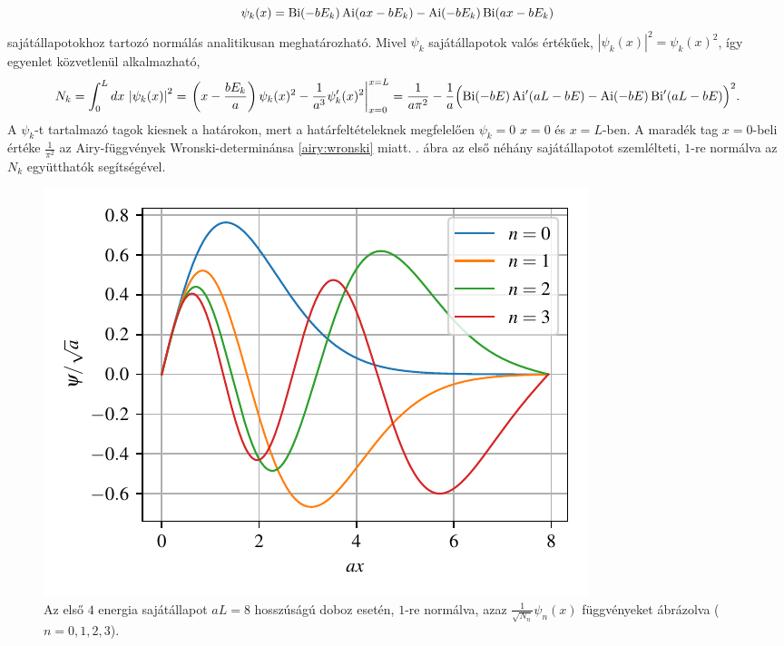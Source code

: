 \begin{equation}
	\psi_k(x) = \operatorname{Bi}(-bE_k)\operatorname{Ai}(ax-bE_k) - \operatorname{Ai}(-bE_k)\operatorname{Bi}(ax-bE_k)
\end{equation}
sajátállapotokhoz tartozó normálás analitikusan meghatározható. Mivel $\psi_k$ sajátállapotok valós értékűek, $\left|\psi_k(x)\right|^2 = \psi_k(x)^2$, így  egyenlet közvetlenül alkalmazható,
\begin{dmath}
	N_k = \int_0^Ldx\,\left|\psi_k(x)\right|^2 = \left.\left(x-\frac{bE_k}{a}\right)\psi_k(x)^2 - \frac{1}{a^3}\psi_k^\prime(x)^2\right|_{x=0}^{x=L} = \frac{1}{a\pi^2}-\frac{1}{a}\Bigl(\Bi(-bE)\Aip(aL-bE)-\Ai(-bE)\Bip(aL-bE)\Bigr)^2.
\end{dmath}
A $\psi_k$-t tartalmazó tagok kiesnek a határokon, mert a határfeltételeknek megfelelően $\psi_k=0$ $x=0$ és $x=L$-ben. A maradék tag $x=0$-beli értéke $\frac{1}{\pi^2}$ az Airy-függvények Wronski-determinánsa \eqref{airy:wronski} miatt. . ábra az első néhány sajátállapotot szemlélteti,  $1$-re normálva az $N_k$ együtthatók segítségével.
\begin{figure}[H]
	\centering
	\includegraphics[scale=1]{./figs/allapotok.pdf}
	\caption[Sajátállapotok]{Az első $4$ energia sajátállapot $aL=8$ hosszúságú doboz esetén, $1$-re normálva, azaz $\frac{1}{\sqrt{N_n}}\psi_n(x)$ függvényeket ábrázolva ($n=0,1,2,3$).}
	\label{vegesf:eigenstates}
\end{figure}
	

